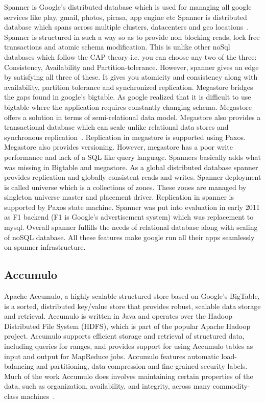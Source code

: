 Spanner is Google's distributed database which is used for managing
all google services like play, gmail, photos, picasa, app engine etc
Spanner is distributed database which spans across multiple clusters,
datacenters and geo locations~\cite{corbett-spanner}.  Spanner is
structured in such a way so as to provide non blocking reads, lock
free transactions and atomic schema modification. This is unlike other
noSql databases which follow the CAP theory i.e. you can choose any
two of the three: Consistency, Availability and
Partition-tolerance. However, spanner gives an edge by satisfying all
three of these. It gives you atomicity and consistency along with
availability, partition tolerance and synchronized replication.
Megastore bridges the gaps found in google's bigtable. As google
realized that it is difficult to use bigtable where the application
requires constantly changing schema. Megastore offers a solution in
terms of semi-relational data model.  Megastore also provides a
transactional database which can scale unlike relational data stores
and synchronous replication~\cite{www-magastore-spanner}.  Replication
in megastore is supported using Paxos. Megastore also provides
versioning. However, megastore has a poor write performance and lack
of a SQL like query language. Spanners basically adds what was missing
in Bigtable and megastore. As a global distributed database spanner
provides replication and globally consistent reads and writes. Spanner
deployment is called universe which is a collections of zones. These
zones are managed by singleton universe master and placement
driver. Replication in spanner is supported by Paxos state
machine. Spanner was put into evaluation in early 2011 as F1 backend
(F1 is Google's advertisement system) which was replacement to
mysql. Overall spanner fulfills the needs of relational database along
with scaling of noSQL database.  All these features make google run
all their apps seamlessly on spanner infrastructure.

     \pv

\subsection{Accumulo}

Apache Accumulo, a highly scalable structured store based on Google’s
BigTable, is a sorted, distributed key/value store that provides
robust, scalable data storage and retrieval. Accumulo is written in
Java and operates over the Hadoop Distributed File System (HDFS),
which is part of the popular Apache Hadoop project. Accumulo supports
efficient storage and retrieval of structured data, including queries
for ranges, and provides support for using Accumulo tables as input
and output for MapReduce jobs.  Accumulo features automatic
load-balancing and partitioning, data compression and fine-grained
security labels. Much of the work Accumulo does involves maintaining
certain properties of the data, such as organization, availability,
and integrity, across many commodity-class
machines~\cite{apache-accumulo}.

